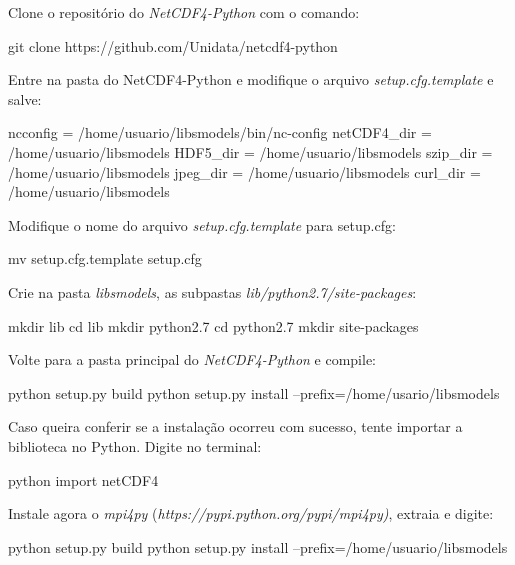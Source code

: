 \noindent Clone o repositório do \textit{NetCDF4-Python} com o comando:
\bigskip

\begin{bashcode}
git clone https://github.com/Unidata/netcdf4-python
\end{bashcode}
\bigskip

\noindent Entre na pasta do NetCDF4-Python e modifique o arquivo \textit{setup.cfg.template} e salve:
\bigskip

\begin{bashcode}
ncconfig    = /home/usuario/libsmodels/bin/nc-config
netCDF4_dir = /home/usuario/libsmodels
HDF5_dir    = /home/usuario/libsmodels
szip_dir    = /home/usuario/libsmodels
jpeg_dir    = /home/usuario/libsmodels
curl_dir    = /home/usuario/libsmodels
\end{bashcode}
\bigskip

\noindent Modifique o nome do arquivo \textit{setup.cfg.template} para setup.cfg:
\bigskip

\begin{bashcode}
mv setup.cfg.template setup.cfg
\end{bashcode}
\bigskip

\noindent Crie na pasta \textit{libsmodels}, as subpastas \textit{lib/python2.7/site-packages}:
\bigskip

\begin{bashcode}
mkdir lib
cd lib
mkdir python2.7
cd python2.7
mkdir site-packages
\end{bashcode}
\bigskip

\noindent Volte para a pasta principal do \textit{NetCDF4-Python} e compile:
\bigskip

\begin{bashcode}
python setup.py build
python setup.py install --prefix=/home/usario/libsmodels
\end{bashcode}
\bigskip

\noindent Caso queira conferir se a instalação ocorreu com sucesso, tente importar a biblioteca no Python. Digite no terminal:
\bigskip

\begin{bashcode}
python
import netCDF4
\end{bashcode}
\bigskip

\noindent Instale agora o \textit{mpi4py} (\textcolor{bleu_cite}{\textit{https://pypi.python.org/pypi/mpi4py)}}, extraia e digite:
\bigskip

\begin{bashcode}
python setup.py build
python setup.py install --prefix=/home/usuario/libsmodels
\end{bashcode}
\bigskip

